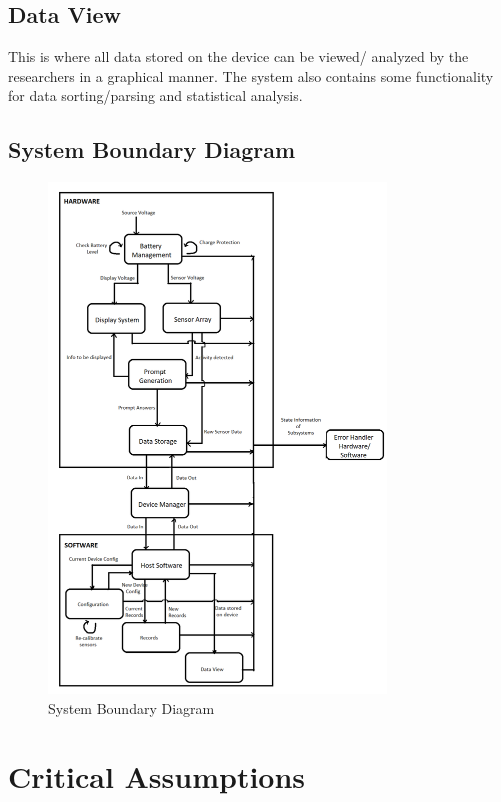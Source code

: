 \documentclass{article}
\begin{document}
\subsection{\label{View_sec}Data View}
This is where all data stored on the device can be viewed/ analyzed by the researchers in a graphical manner. The system also contains some functionality for data sorting/parsing and statistical analysis.


\subsection{System Boundary Diagram}
\begin{figure}[H]
	\begin{center}
		\includegraphics[width=0.80\textwidth]{SystemBoundaryDiagram}
		\caption{System Boundary Diagram}
		\label{Fig_SBD}
	\end{center}
\end{figure}


\section{Critical Assumptions }
\end{document}
